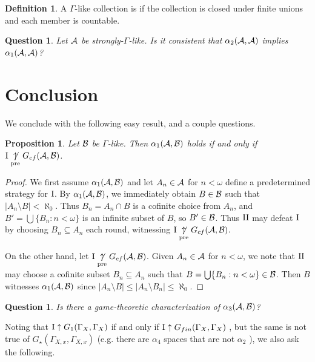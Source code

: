\documentclass{amsart}
\theoremstyle{plain}
\newtheorem{proposition}[theorem]{Proposition}
\newtheorem{question}[theorem]{Question}
\theoremstyle{definition}
\newtheorem{definition}[theorem]{Definition}
\theoremstyle{remark}
\theoremstyle{plain}
\theoremstyle{definition}
\theoremstyle{remark}
\begin{document}
\begin{definition}
A \(\Gamma\)-like collection is 
if the collection is closed under finite unions and each member
is countable.
\end{definition}

\begin{question}
Let \(\mathcal{A}\) be strongly-\(\Gamma\)-like.
Is it consistent that \(\alpha_2(\mathcal{A},\mathcal{A})\)
implies \(\alpha_1(\mathcal{A},\mathcal{A})\)?
\end{question}


\section{Conclusion}

We conclude with the following easy result, and a couple questions.

\begin{proposition}
Let \(\mathcal{B}\) be \(\Gamma\)-like. Then \(\alpha_1(\mathcal{A},\mathcal{B})\) holds if and only
if \(\mathrm{I}\underset{\text{pre}}{\not\uparrow} G_{cf}(\mathcal{A},\mathcal{B})\).
\end{proposition}

\begin{proof}
We first assume \(\alpha_1(\mathcal{A},\mathcal{B})\) and let \(A_n\in\mathcal{A}\) for \(n<\omega\)
define a predetermined strategy for \(\mathrm{I}\). By \(\alpha_1(\mathcal{A},\mathcal{B})\), we
immediately obtain \(B\in\mathcal{B}\) such that \(|A_n\setminus B|<\aleph_0\). Thus
\(B_n=A_n\cap B\) is a cofinite choice from \(A_n\), and 
\(B'=\bigcup\{B_n:n<\omega\}\) is an infinite subset of \(B\),
so \(B'\in\mathcal{B}\). Thus \(\mathrm{II}\) may defeat \(\mathrm{I}\) by choosing
\(B_n\subseteq A_n\) each round, witnessing \(\mathrm{I}\underset{\text{pre}}{\not\uparrow} G_{cf}(\mathcal{A},\mathcal{B})\).

On the other hand, let \(\mathrm{I}\underset{\text{pre}}{\not\uparrow} G_{cf}(\mathcal{A},\mathcal{B})\). Given \(A_n\in\mathcal{A}\)
for \(n<\omega\), we note that \(\mathrm{II}\) may choose a cofinite subset \(B_n\subseteq A_n\)
such that \(B=\bigcup\{B_n:n<\omega\}\in\mathcal{B}\). Then \(B\) witnesses \(\alpha_1(\mathcal{A},\mathcal{B})\)
since \(|A_n\setminus B|\leq|A_n\setminus B_n|\leq\aleph_0\).
\end{proof}

\begin{question}
Is there a game-theoretic characterization of \(\alpha_3(\mathcal{A},\mathcal{B})\)?
\end{question}

Noting that \(\mathrm{I}\uparrow G_1(\Gamma_X,\Gamma_X)\) if and only if
\(\mathrm{I}\uparrow G_{fin}(\Gamma_X,\Gamma_X)\) \cite{MR2417134}, but
the same is not true of \(G_\star(\Gamma_{X,x},\Gamma_{X,x})\)
(e.g. there are \(\alpha_4\) spaces that are not \(\alpha_2\)
\cite{shakhmatov2002convergence}),
we also ask the following.
\end{document}
